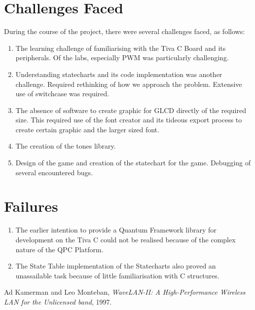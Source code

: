 \documentclass[a4paper,12pt,oneside]{book}
\begin{document}
\section{Challenges Faced}
\qquad During the course of the project, there were several challenges faced, as follows:
\begin{enumerate}
\item The learning challenge of familiarising with the Tiva C Board and its peripherals. Of the labs, especially PWM was particularly challenging.
\item Understanding statecharts and its code implementation was another challenge. Required rethinking of how we approach the problem. Extensive use of switchcase was required.
\item The absence of software to create graphic for GLCD directly of the required size. This required use of the font creator and its tideous export process to create certain graphic and the larger sized font.
\item The creation of the tones library.
\item Design of the game and creation of the statechart for the game. Debugging of several encountered bugs.
\end{enumerate}
\section{Failures}
\begin{enumerate}
\item The earlier intention to provide a Quantum Framework library for development on the Tiva C could not be realised because of the complex nature of the QPC Platform.
\item The State Table implementation of the Statecharts also proved an unassailable task because of little familiarisation with C structures.
\end{enumerate}
\begin{thebibliography}{li}
Ad Kamerman and Leo Monteban,
{\em WaveLAN-II: A High-Performance Wireless LAN for the Unlicensed band},
1997.
\end{thebibliography}
\end{document}
